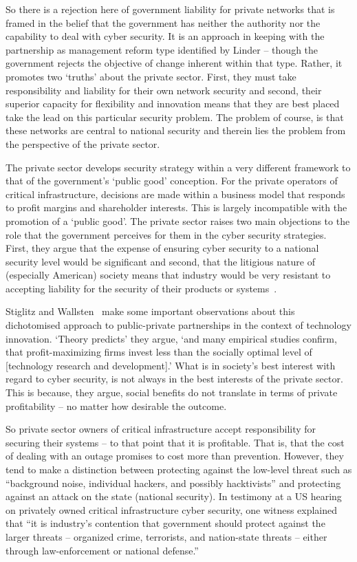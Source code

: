 \documentclass[a4paper,11pt]{article}
\begin{document}
So there is a rejection here of government liability for private
networks that is framed in the belief that the government has neither
the authority nor the capability to deal with cyber security. It is an
approach in keeping with the partnership as management reform type
identified by Linder -- though the government rejects the objective of
change inherent within that type. Rather, it promotes two `truths'
about the private sector. First, they must take responsibility and
liability for their own network security and second, their superior
capacity for flexibility and innovation means that they are best
placed take the lead on this particular security problem. The problem
of course, is that these networks are central to national security and
therein lies the problem from the perspective of the private sector.

The private sector develops security strategy within a very different
framework to that of the government's `public good' conception. For
the private operators of critical infrastructure, decisions are made
within a business model that responds to profit margins and
shareholder interests. This is largely incompatible with the promotion
of a `public good'. The private sector raises two main objections to
the role that the government perceives for them in the cyber security
strategies. First, they argue that the expense of ensuring cyber
security to a national security level would be significant and second,
that the litigious nature of (especially American) society means that
industry would be very resistant to accepting liability for the
security of their products or systems~\cite{paller:2005}.  

Stiglitz and Wallsten~\cite{stiglitz+wallsten:1999} make some
important observations about this dichotomised approach to
public-private partnerships in the context of technology
innovation. `Theory predicts' they argue, `and many empirical studies
confirm, that profit-maximizing firms invest less than the socially
optimal level of [technology research and development].' What is in
society’s best interest with regard to cyber security, is not always
in the best interests of the private sector. This is because, they
argue, social benefits do not translate in terms of private
profitability -- no matter how desirable the outcome.

So private sector owners of critical infrastructure accept
responsibility for securing their systems -- to that point that it is
profitable. That is, that the cost of dealing with an outage promises
to cost more than prevention. However, they tend to make a distinction
between protecting against the low-level threat such as ``background
noise, individual hackers, and possibly hacktivists'' and protecting
against an attack on the state (national security). In testimony at a
US hearing on privately owned critical infrastructure cyber security,
one witness explained that ``it is industry’s contention that
government should protect against the larger threats -- organized
crime, terrorists, and nation-state threats -- either through
law-enforcement or national defense.''
\end{document}

